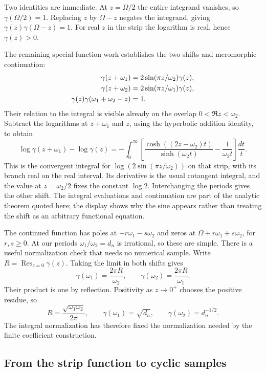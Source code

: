 Two identities are immediate. At $z=\Omega/2$ the entire
integrand vanishes, so $\gamma(\Omega/2)=1$. Replacing $z$ by
$\Omega-z$ negates the integrand, giving
$\gamma(z)\gamma(\Omega-z)=1$. For real $z$ in the strip
the logarithm is real, hence $\gamma(z)>0$.

The remaining special-function work establishes the two shifts
and meromorphic continuation:
\begin{align}
 \gamma(z+\omega_1)
 &=2\sin(\pi z/\omega_2)\gamma(z),\notag\\
 \gamma(z+\omega_2)
 &=2\sin(\pi z/\omega_1)\gamma(z),\notag\\
\gamma(z)\gamma(\omega_1+\omega_2-z)&=1.
 \label{eq:HI-gamma-identities}
\end{align}
Their relation to the integral is visible already on the overlap
$0<\Re z<\omega_2$. Subtract the logarithms at $z+\omega_1$
and $z$, using the hyperbolic addition identity, to obtain
\[
 \log\gamma(z+\omega_1)-\log\gamma(z)
 =-\int_0^\infty
 \left[\frac{\cosh((2z-\omega_2)t)}{\sinh(\omega_2t)}
       -\frac1{\omega_2t}\right]\frac{dt}{t}.
\]
This is the convergent integral for $\log(2\sin(\pi z/\omega_2))$
on that strip, with its branch real on the real interval. Its
derivative is the usual cotangent integral, and the value at
$z=\omega_2/2$ fixes the constant $\log2$. Interchanging the
periods gives the other shift. The integral evaluations and
continuation are part of the analytic theorem quoted here; the
display shows why the sine appears rather than treating the
shift as an arbitrary functional equation.

The continued function has poles at
$-r\omega_1-s\omega_2$ and zeros at
$\Omega+r\omega_1+s\omega_2$, for $r,s\geq0$. At our periods
$\omega_1/\omega_2=d_n$ is irrational, so these are simple.
There is a useful normalization check that needs no numerical
sample. Write $R=\operatorname{Res}_{z=0}\gamma(z)$.
Taking the limit in both shifts gives
\[
 \gamma(\omega_1)=\frac{2\pi R}{\omega_2},\qquad
 \gamma(\omega_2)=\frac{2\pi R}{\omega_1}.
\]
Their product is one by reflection. Positivity as $z\to0^+$
chooses the positive residue, so
\[
 R=\frac{\sqrt{\omega_1\omega_2}}{2\pi},\qquad
 \gamma(\omega_1)=\sqrt{d_n},\qquad
 \gamma(\omega_2)=d_n^{-1/2}.
\]
The integral normalization has therefore fixed the normalization
needed by the finite coefficient construction.

\subsection{From the strip function to cyclic samples}

